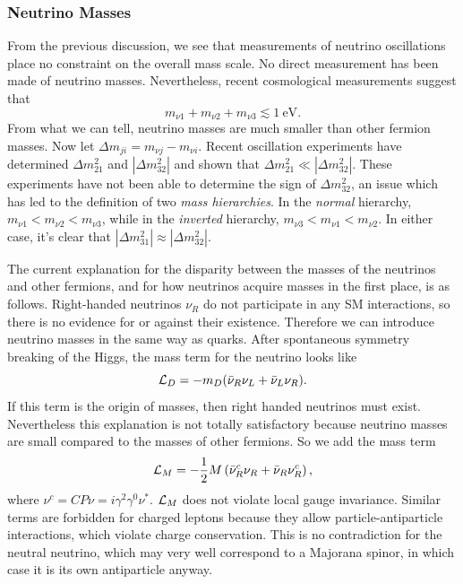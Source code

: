 \subsubsection{Neutrino Masses}
From the previous discussion, we see that measurements of neutrino oscillations
place no constraint on the overall mass scale. No direct measurement has been
made of neutrino masses. Nevertheless, recent cosmological measurements suggest
that \cite{thomson_modern_2013}
\begin{equation}
  m_{\nu1}+m_{\nu2}+m_{\nu3}\lesssim1~\text{eV}. 
\end{equation}
From what we can tell,
neutrino masses are much smaller than other fermion masses. Now let
$\Delta m_{ji}=m_{\nu j}-m_{\nu i}$.
Recent oscillation experiments have determined $\Delta m_{21}^2$ and
$|\Delta m_{32}^2|$ and shown that $\Delta m_{21}^2\ll|\Delta m_{32}^2|$.
These experiments have not been able to determine the sign of
$\Delta m_{32}^2$, an issue which has led to the definition of two {\it mass
hierarchies}. In the {\it normal} hierarchy, $m_{\nu1}<m_{\nu2}<m_{\nu3}$,
while in the {\it inverted} hierarchy, $m_{\nu3}<m_{\nu1}<m_{\nu2}$. In
either case, it's clear that $|\Delta m_{31}^2|\approx|\Delta m_{32}^2|$.

The current explanation for the disparity between the masses of the neutrinos
and other fermions, and for how neutrinos acquire masses in the
first place, is as follows. Right-handed neutrinos $\nu_R$ do not
participate in any SM interactions, so
there is no evidence for or against their existence. Therefore we can introduce
neutrino masses in the same way as quarks. After spontaneous symmetry breaking
of the Higgs, the mass term for the neutrino looks like
\begin{equation}
  \mathcal{L}_D=-m_D(\bar{\nu}_R\nu_L+\bar{\nu}_L\nu_R).
\end{equation}
If this term is the origin of masses, then right handed neutrinos must exist.
Nevertheless this explanation is not totally satisfactory because neutrino
masses are small compared to the masses of other fermions. So we add
the mass term
\begin{equation}
  \mathcal{L}_M=-\frac{1}{2}M\left(\bar{\nu}^c_R\nu_R+\bar{\nu}_R\nu^c_R\right),
\end{equation}
where $\nu^c=CP\nu=i\gamma^2\gamma^0\nu^*$. $\mathcal{L}_M$ does not violate local
gauge invariance. Similar terms are forbidden for charged leptons because
they allow particle-antiparticle interactions, which violate charge
conservation. This is no contradiction for the neutral neutrino, which may
very well correspond to a Majorana spinor, in which case it is its own
antiparticle anyway.

